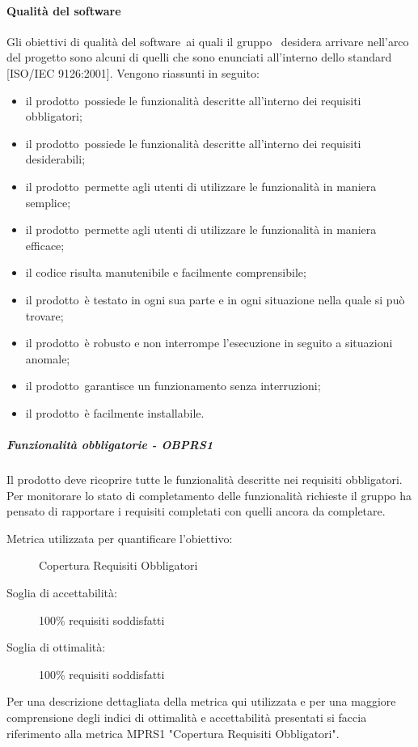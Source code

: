 \documentclass[../PianoDiQualifica.tex]{subfiles}
\begin{document}
			\paragraph{Qualità del software}
			Gli obiettivi di qualità del software\g\ ai quali il gruppo \leaf\ desidera arrivare nell'arco del progetto sono alcuni di quelli che sono enunciati all'interno dello standard [ISO/IEC 9126:2001]. Vengono riassunti in seguito:
		\begin{itemize}
			\item il prodotto\g\ possiede le funzionalità descritte all'interno dei requisiti obbligatori;
			\item il prodotto\g\ possiede le funzionalità descritte all'interno dei requisiti desiderabili;
			\item il prodotto\g\ permette agli utenti di utilizzare le funzionalità in maniera semplice;
			\item il prodotto\g\ permette agli utenti di utilizzare le funzionalità in maniera efficace;
			\item il codice risulta manutenibile e facilmente comprensibile;
			\item il prodotto\g\ è testato in ogni sua parte e in ogni situazione nella quale si può trovare;
			\item il prodotto\g\ è robusto e non interrompe l'esecuzione in seguito a situazioni anomale;
			\item il prodotto\g{}arantisce un funzionamento senza interruzioni;
			\item il prodotto\g\ è facilmente installabile.
		\end{itemize}
				\subparagraph{Funzionalità obbligatorie - OBPRS1}
				Il prodotto deve ricoprire tutte le funzionalità descritte nei requisiti obbligatori. Per monitorare lo stato di completamento delle funzionalità richieste il gruppo ha pensato di rapportare i requisiti completati con quelli ancora da completare.
					\begin{description}
						\item [Metrica utilizzata per quantificare l'obiettivo:] Copertura Requisiti Obbligatori
						\item [Soglia di accettabilità:] 100\% requisiti soddisfatti
						\item [Soglia di ottimalità:] 100\% requisiti soddisfatti
					\end{description}
					Per una descrizione dettagliata della metrica qui utilizzata e per una maggiore comprensione degli indici di ottimalità e accettabilità presentati si faccia riferimento alla metrica MPRS1 "Copertura Requisiti Obbligatori".
\end{document}
